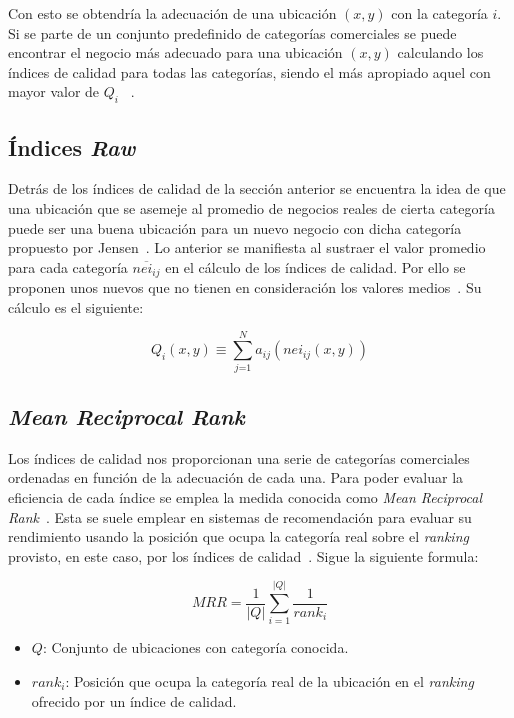 Con esto se obtendría la adecuación de una ubicación $(x,y)$ con la categoría $i$. Si se parte de un conjunto predefinido de categorías comerciales se puede encontrar el negocio más adecuado para una ubicación $(x,y)$ calculando los índices de calidad para todas las categorías, siendo el más apropiado aquel con mayor valor de $Q_i$ ~\cite{Ahedo2021,Jensen2006}.

\subsection{Índices \textit{Raw}}

Detrás de los índices de calidad de la sección anterior se encuentra la idea de que una ubicación que se asemeje al promedio de negocios reales de cierta categoría puede ser una buena ubicación para un nuevo negocio con dicha categoría propuesto por Jensen~\cite{Jensen2006}. Lo anterior se manifiesta al sustraer el valor promedio para cada categoría $\overline{nei_{ij}}$ en el cálculo de los índices de calidad. Por ello se proponen unos nuevos que no tienen en consideración los valores medios~\cite{Ahedo2021}. Su cálculo es el siguiente:

\begin{equation*}
	Q_i(x,y) \equiv \sum_\textit{j=1}^N a_{ij}  (nei_{ij}(x,y))
\end{equation*}

\subsection{\textit{Mean Reciprocal Rank}}

Los índices de calidad nos proporcionan una serie de categorías comerciales ordenadas en función de la adecuación de cada una. Para poder evaluar la eficiencia de cada índice se emplea la medida conocida como \textit{Mean Reciprocal Rank}~\cite{MRR}. Esta se suele emplear en sistemas de recomendación para evaluar su rendimiento usando la posición que ocupa la categoría real sobre el \textit{ranking} provisto, en este caso, por los índices de calidad~\cite{Ahedo2021}. Sigue la siguiente formula:

\begin{equation*}
	MRR = \frac{1}{|Q|}  \sum_{i=1}^{|Q|} \frac{1}{rank_i}
\end{equation*}

\begin{itemize}
	\item $Q$: Conjunto de ubicaciones con categoría conocida.
	\item $rank_i$: Posición que ocupa la categoría real de la ubicación en el \textit{ranking} ofrecido por un índice de calidad.
\end{itemize}


